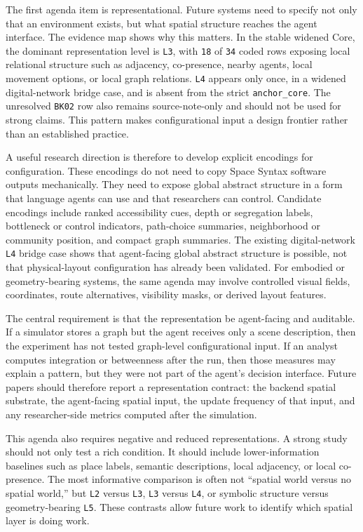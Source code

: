 \documentclass[
  twocolumn]{article}
\begin{document}
The first agenda item is representational. Future systems need to
specify not only that an environment exists, but what spatial structure
reaches the agent interface. The evidence map shows why this matters. In
the stable widened Core, the dominant representation level is
\texttt{L3}, with \texttt{18} of \texttt{34} coded rows exposing local
relational structure such as adjacency, co-presence, nearby agents,
local movement options, or local graph relations. \texttt{L4} appears
only once, in a widened digital-network bridge case, and is absent from
the strict \texttt{anchor\_core}. The unresolved \texttt{BK02} row also
remains source-note-only and should not be used for strong claims. This
pattern makes configurational input a design frontier rather than an
established practice.

A useful research direction is therefore to develop explicit encodings
for configuration. These encodings do not need to copy Space Syntax
software outputs mechanically. They need to expose global abstract
structure in a form that language agents can use and that researchers
can control. Candidate encodings include ranked accessibility cues,
depth or segregation labels, bottleneck or control indicators,
path-choice summaries, neighborhood or community position, and compact
graph summaries. The existing digital-network \texttt{L4} bridge case
shows that agent-facing global abstract structure is possible, not that
physical-layout configuration has already been validated. For embodied
or geometry-bearing systems, the same agenda may involve controlled
visual fields, coordinates, route alternatives, visibility masks, or
derived layout features.

The central requirement is that the representation be agent-facing and
auditable. If a simulator stores a graph but the agent receives only a
scene description, then the experiment has not tested graph-level
configurational input. If an analyst computes integration or betweenness
after the run, then those measures may explain a pattern, but they were
not part of the agent's decision interface. Future papers should
therefore report a representation contract: the backend spatial
substrate, the agent-facing spatial input, the update frequency of that
input, and any researcher-side metrics computed after the simulation.

This agenda also requires negative and reduced representations. A strong
study should not only test a rich condition. It should include
lower-information baselines such as place labels, semantic descriptions,
local adjacency, or local co-presence. The most informative comparison
is often not ``spatial world versus no spatial world,'' but \texttt{L2}
versus \texttt{L3}, \texttt{L3} versus \texttt{L4}, or symbolic
structure versus geometry-bearing \texttt{L5}. These contrasts allow
future work to identify which spatial layer is doing work.
\end{document}
